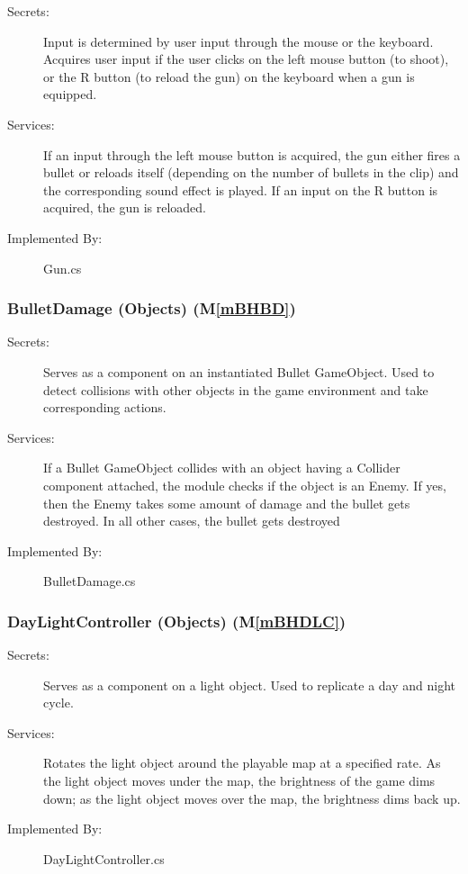 \documentclass[12pt, titlepage]{article}
\newcommand{\mref}[1]{M\ref{#1}}
\begin{document}
\begin{description}
	\item[Secrets:] Input is determined by user input through the mouse or the keyboard. Acquires user input if the user clicks on the left mouse button {\color {magenta} (to shoot),} or the R button {\color {magenta} (to reload the gun)} on the keyboard when a gun is equipped.
	\item[Services:] If an input through the left mouse button is acquired, the gun either fires a bullet or reloads itself (depending on the number of bullets in the clip) and the corresponding sound effect is played. If an input on the R button is acquired, the gun is reloaded.
	\item[Implemented By:] Gun.cs
\end{description}

\subsubsection{BulletDamage (Objects) (\mref{mBHBD})}

\begin{description}
	\item[Secrets:] Serves as a component on an instantiated Bullet GameObject. Used to detect collisions with other objects in the game environment and take corresponding actions.
	\item[Services:] If a Bullet GameObject collides with an object having a Collider component attached, the module checks if the object is an Enemy. If yes, then the Enemy takes some amount of damage and the bullet gets destroyed. In all other cases, the bullet gets destroyed
	\item[Implemented By:] BulletDamage.cs
\end{description}

\subsubsection{{\color{magenta}DayLightController (Objects) (\mref{mBHDLC})}}

\begin{description}
	\item[Secrets:] {\color{magenta}Serves as a component on a light object. Used to replicate a day and night cycle.}
	\item[Services:] {\color{magenta} Rotates the light object around the playable map at a specified rate. As the light object moves under the map, the brightness of the game dims down; as the light object moves over the map, the brightness dims back up.}
	\item[Implemented By:] {\color{magenta}DayLightController.cs}
\end{description}
\end{document}
